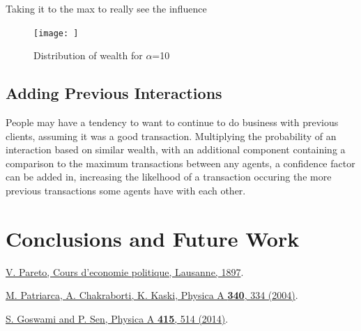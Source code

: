 \documentclass[12pt]{article} %
\begin{document}
Taking it to the max to really see the influence

\begin{figure}
	\texttt{[image: ]}
	\caption{Distribution of wealth for $\alpha$=10}
	\label{}
\end{figure}

\subsection{Adding Previous Interactions}
People may have a tendency to want to continue to do business with previous
clients, assuming it was a good transaction. Multiplying the probability of an
interaction based on similar wealth, with an additional component containing a
comparison to the maximum transactions between any agents, a confidence factor
can be added in, increasing the likelhood of a transaction occuring the more
previous transactions some agents have with each other.


\section{Conclusions and Future Work}


\begin{thebibliography}{2} %
\href{{http://www.institutcoppet.org/2012/05/08/cours-deconomie-politique-1896-de-vilfredo-pareto}}{V. Pareto, Cours d'economie politique, Lausanne, 1897}.

\href{{http://www.sciencedirect.com/science/article/pii/S0378437104004327}}{M. Patriarca, A. Chakraborti, K. Kaski, Physica A \textbf{340}, 334 (2004)}.

\href{{http://www.sciencedirect.com/science/article/pii/S0378437114006967}}{S. Goswami and P. Sen, Physica A \textbf{415}, 514 (2014)}.
\end{thebibliography}
\end{document}
